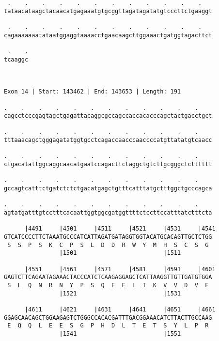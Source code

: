 \documentclass{article}
\begin{document}
\begin{Verbatim}
 .    .    .    .    .    .    .    .    .    .    .    .   
tataacataagctacaacatgagaaatgtgcggttagatagatatgtcccttctgaaggt
                                                            
 .    .    .    .    .    .    .    .    .    .    .    .   
cagaaaaaaatataatggaggtaaaacctgaacaagcttggaaactgatggtagacttct
                                                            
 .    .
tcaaggc
       
       
 
Exon 14 | Start: 143462 | End: 143653 | Length: 191
 
.    .    .    .    .    .    .    .    .    .    .    .    
cagcctcccgagtagctgagattacaggcgccagccaccacacccagctactgacctgct
                                                            
.    .    .    .    .    .    .    .    .    .    .    .    
tttaaacagctgggagatatggtgcctcagaccaacccaaccccatgttatatgtcaacc
                                                            
.    .    .    .    .    .    .    .    .    .    .    .    
ctgacatattggcaggcaacatgaatccagacttctaggctgtcttgcgggctctttttt
                                                            
.    .    .    .    .    .    .    .    .    .    .    .    
gccagtcatttctgatctctctgacatgagctgtttcatttatgctttggctgcccagca
                                                            
.    .    .    .    .    .    .    .    .    .    .    .    
agtatgatttgtcctttcacaattggtggcgatggttttctccttccatttatctttcta
                                                            
      |4491     |4501     |4511     |4521     |4531     |4541
GTCATCCCCTTCTAAATGCCCATCATTAGATGATAGGTGGTACATGCACAGTTGCTCTGG
 S  S  P  S  K  C  P  S  L  D  D  R  W  Y  M  H  S  C  S  G 
                |1501                         |1511         
  
      |4551     |4561     |4571     |4581     |4591     |4601
GAGTCTTCAGAATAGAAACTACCCATCTCAAGAGGAGCTCATTAAGGTTGTTGATGTGGA
 S  L  Q  N  R  N  Y  P  S  Q  E  E  L  I  K  V  V  D  V  E 
                |1521                         |1531         
  
      |4611     |4621     |4631     |4641     |4651     |4661
GGAGCAACAGCTGGAAGAGTCTGGGCCACACGATTTGACGGAAACATCTTACTTGCCAAG
 E  Q  Q  L  E  E  S  G  P  H  D  L  T  E  T  S  Y  L  P  R 
                |1541                         |1551         
  

\end{Verbatim}
\end{document}
